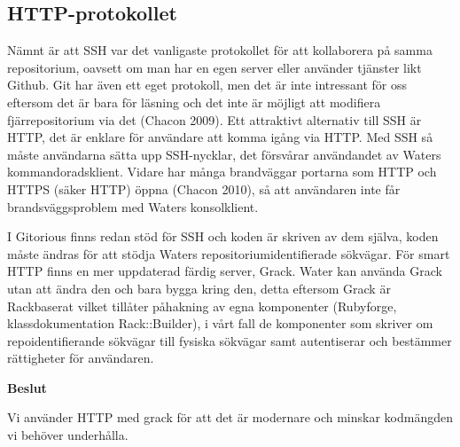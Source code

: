 \subsection{HTTP-protokollet}
Nämnt är att SSH var det vanligaste protokollet för att kollaborera på samma repositorium, oavsett om man har en egen server eller använder tjänster likt Github. Git har även ett eget protokoll, men det är inte intressant för oss eftersom det är bara för läsning och det inte är möjligt att modifiera fjärrepositorium via det (Chacon 2009). Ett attraktivt alternativ till SSH är HTTP, det är enklare för användare att komma igång via HTTP.  Med SSH så måste användarna sätta upp SSH-nycklar, det försvårar användandet av Waters kommandoradsklient.  Vidare har många brandväggar portarna som HTTP och HTTPS (säker HTTP) öppna (Chacon 2010), så att användaren inte får brandsväggsproblem med Waters konsolklient.

I Gitorious finns redan stöd för SSH och koden är skriven av dem själva, koden måste ändras för att stödja Waters repositoriumidentifierade sökvägar. För smart HTTP finns en mer uppdaterad färdig server, Grack.  Water kan använda Grack utan att ändra den och bara bygga kring den, detta eftersom Grack är Rackbaserat vilket tillåter påhakning av egna komponenter (Rubyforge, klassdokumentation Rack::Builder), i vårt fall de komponenter som skriver om repoidentifierande sökvägar till fysiska sökvägar samt autentiserar och bestämmer rättigheter för användaren.

\begin{flushright}
  
  \textbf{Beslut}
  
  Vi använder HTTP med grack för att det är modernare och minskar kodmängden vi behöver underhålla.
  
\end{flushright}